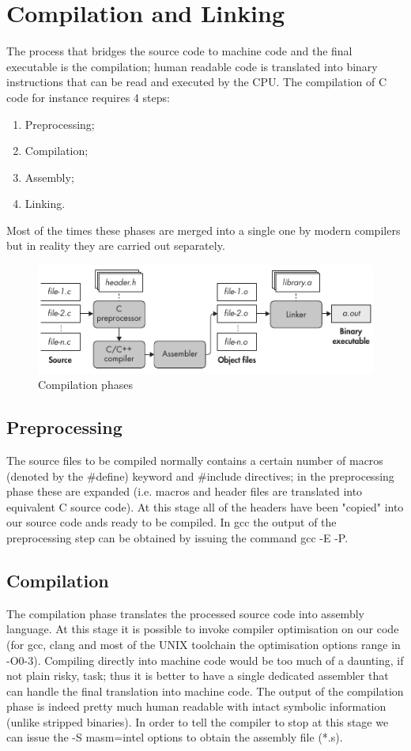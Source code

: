 \chapter{Compilation and Linking}
The process that bridges the source code to machine code and the final executable is the compilation; human readable
code is translated into binary instructions that can be read and executed by the CPU. The compilation of C code for
instance requires 4 steps:
\begin{enumerate}
    \item Preprocessing;
    \item Compilation;
    \item Assembly;
    \item Linking.
\end{enumerate}
Most of the times these phases are merged into a single one by modern compilers but in reality they are carried out
separately.
\begin{figure}[!htbp]
    \centering
    \includegraphics[scale=0.7]{./pics/compilation.png}
    \caption{Compilation phases}
    \label{comp}
\end{figure}

\section{Preprocessing}
The source files to be compiled normally contains a certain number of macros (denoted by the {\ttfamily \#define})
keyword and {\ttfamily \#include} directives; in the preprocessing phase these are expanded (i.e. macros and header
files are translated into equivalent C source code). At this stage all of the headers have been "copied" into our
source code ands ready to be compiled. In gcc the output of the preprocessing step can be obtained by issuing the
command {\ttfamily gcc -E -P}.

\section{Compilation}
The compilation phase translates the processed source code into assembly language. At this stage it is possible to
invoke compiler optimisation on our code (for gcc, clang and most of the UNIX toolchain the optimisation options
range in {\ttfamily -O0-3}). Compiling directly into machine code would be too much of a daunting, if not plain
risky, task; thus it is better to have a single dedicated assembler that can handle the final translation into
machine code. The output of the compilation phase is indeed pretty much human readable with intact symbolic
information (unlike stripped binaries). In order to tell the compiler to stop at this stage we can issue the {\ttfamily
-S masm=intel} options to obtain the assembly file (*.s).

